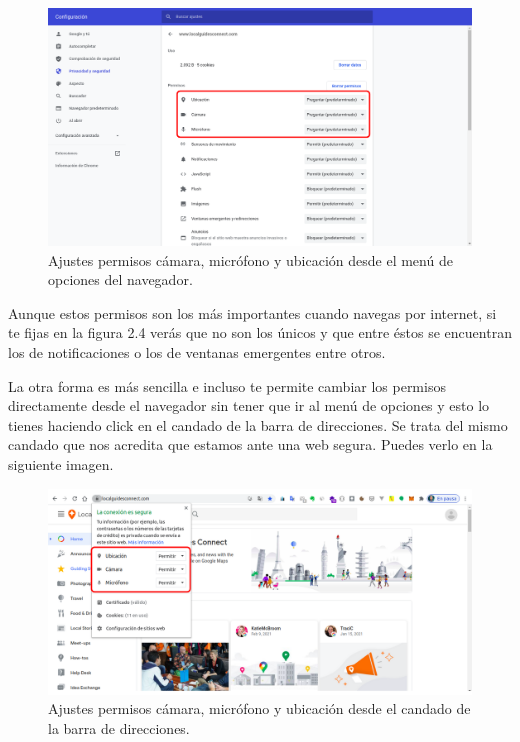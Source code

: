 \documentclass[
  spanish,
  a4paper,
  openany]{book}
\begin{document}
\begin{figure}

{\centering \includegraphics[width=0.75\linewidth]{images/ajuste-permisos} 

}

\caption{Ajustes permisos cámara, micrófono y ubicación desde el menú de opciones del navegador.}\label{fig:unnamed-chunk-7}
\end{figure}

Aunque estos permisos son los más importantes cuando navegas por internet, si te fijas en la figura 2.4 verás que no son los únicos y que entre éstos se encuentran los de notificaciones o los de ventanas emergentes entre otros.

La otra forma es más sencilla e incluso te permite cambiar los permisos directamente desde el navegador sin tener que ir al menú de opciones y esto lo tienes haciendo click en el candado de la barra de direcciones. Se trata del mismo candado que nos acredita que estamos ante una web segura. Puedes verlo en la siguiente imagen.

\begin{figure}

{\centering \includegraphics[width=0.75\linewidth]{images/ajuste-permisos-desde-navegador} 

}

\caption{Ajustes permisos cámara, micrófono y ubicación desde el candado de la barra de direcciones.}\label{fig:unnamed-chunk-8}
\end{figure}
\end{document}
